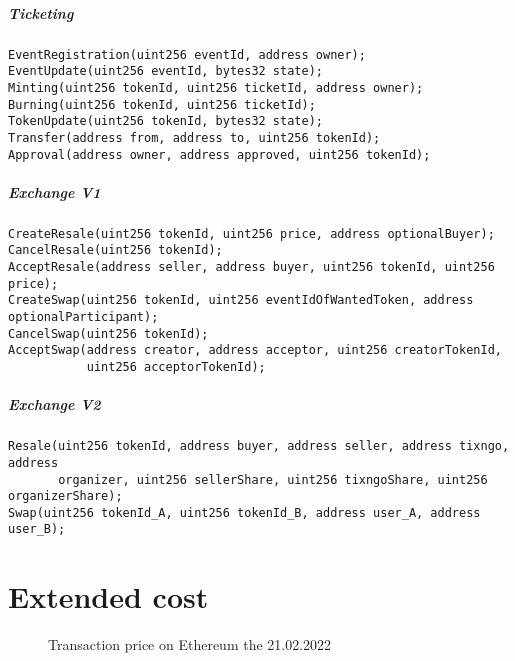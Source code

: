\documentclass[a4paper,11pt,oneside]{report}
\begin{document}
\paragraph{Ticketing}
\begin{verbatim}
EventRegistration(uint256 eventId, address owner);
EventUpdate(uint256 eventId, bytes32 state);
Minting(uint256 tokenId, uint256 ticketId, address owner);
Burning(uint256 tokenId, uint256 ticketId);
TokenUpdate(uint256 tokenId, bytes32 state);
Transfer(address from, address to, uint256 tokenId);
Approval(address owner, address approved, uint256 tokenId);
\end{verbatim}

\paragraph{Exchange V1}
\begin{verbatim}
CreateResale(uint256 tokenId, uint256 price, address optionalBuyer);
CancelResale(uint256 tokenId);
AcceptResale(address seller, address buyer, uint256 tokenId, uint256 price);
CreateSwap(uint256 tokenId, uint256 eventIdOfWantedToken, address optionalParticipant);
CancelSwap(uint256 tokenId);
AcceptSwap(address creator, address acceptor, uint256 creatorTokenId, 
           uint256 acceptorTokenId);
\end{verbatim}

\paragraph{Exchange V2}
\begin{verbatim}
Resale(uint256 tokenId, address buyer, address seller, address tixngo, address 
       organizer, uint256 sellerShare, uint256 tixngoShare, uint256 organizerShare);
Swap(uint256 tokenId_A, uint256 tokenId_B, address user_A, address user_B);
\end{verbatim}

\chapter{Extended cost}
\label{sec:appendix_b}

\begin{center}
\begin{figure}[h!] 
  \caption{Transaction price on Ethereum the 21.02.2022}
  \label{fig:transactions_price_ethereum_21_02_2022}
\end{figure}
\end{center}
\end{document}
